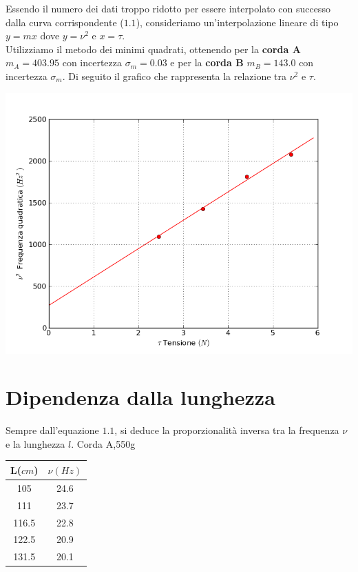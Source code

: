 Essendo il numero dei dati troppo ridotto per essere interpolato con successo dalla curva corrispondente ($1.1$), consideriamo un'interpolazione lineare di tipo $y = mx$ dove   $y= \nu^2$ e $x = \tau$.
\\
Utilizziamo il metodo dei minimi quadrati, ottenendo per la\textbf{ corda A} $m_A = 403.95$ con incertezza $\sigma_m =0.03$ e per la \textbf{corda B} $m_B=143.0$ con incertezza $\sigma_m$.  Di seguito il grafico che rappresenta la relazione tra $\nu^2$ e $\tau$.

\begin{center}
\includegraphics[scale=0.5]{../grafici/corda_tensione}
\end{center}



\section{Dipendenza dalla lunghezza}
Sempre dall'equazione $1.1$, si deduce la proporzionalità inversa tra la frequenza $\nu$ e la lunghezza $l$. 
Corda A,550g

\begin{center}


\begin{tabular}{c|c}
L($cm$) & $\nu (Hz) $ \\
\midrule
105 & 24.6\\
111 & 23.7\\
116.5 & 22.8 \\
122.5 & 20.9 \\
131.5 & 20.1 \\
\end{tabular}
\end{center}


